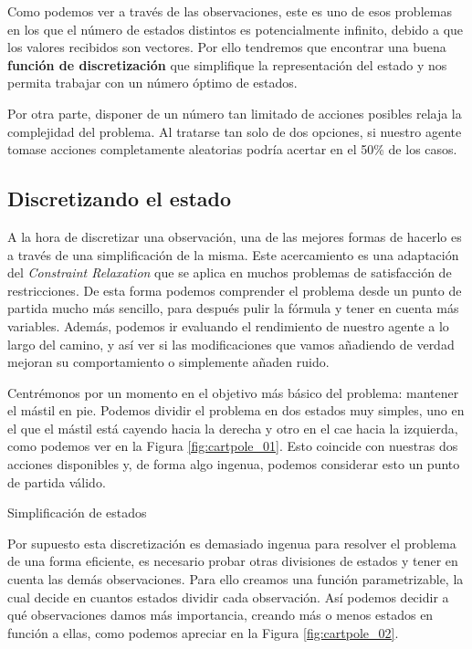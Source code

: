 Como podemos ver a través de las observaciones, este es uno de esos problemas en los que el número de estados distintos es potencialmente infinito, debido a que los valores recibidos son vectores. Por ello tendremos que encontrar una buena \textbf{función de discretización} que simplifique la representación del estado y nos permita trabajar con un número óptimo de estados.

Por otra parte, disponer de un número tan limitado de acciones posibles relaja la complejidad del problema. Al tratarse tan solo de dos opciones, si nuestro agente tomase acciones completamente aleatorias podría acertar en el 50\% de los casos.

\subsection{Discretizando el estado}
A la hora de discretizar una observación, una de las mejores formas de hacerlo es a través de una simplificación de la misma. Este acercamiento es una adaptación del \textit{Constraint Relaxation} que se aplica en muchos problemas de satisfacción de restricciones. De esta forma podemos comprender el problema desde un punto de partida mucho más sencillo, para después pulir la fórmula y tener en cuenta más variables. Además, podemos ir evaluando el rendimiento de nuestro agente a lo largo del camino, y así ver si las modificaciones que vamos añadiendo de verdad mejoran su comportamiento o simplemente añaden ruido.

Centrémonos por un momento en el objetivo más básico del problema: mantener el mástil en pie. Podemos dividir el problema en dos estados muy simples, uno en el que el mástil está cayendo hacia la derecha y otro en el cae hacia la izquierda, como podemos ver en la Figura \ref{fig:cartpole_01}. Esto coincide con nuestras dos acciones disponibles y, de forma algo ingenua, podemos considerar esto un punto de partida válido.

%
       {Simplificación de estados}

Por supuesto esta discretización es demasiado ingenua para resolver el problema de una forma eficiente, es necesario probar otras divisiones de estados y tener en cuenta las demás observaciones. Para ello creamos una función parametrizable, la cual decide en cuantos estados dividir cada observación. Así podemos decidir a qué observaciones damos más importancia, creando más o menos estados en función a ellas, como podemos apreciar en la Figura \ref{fig:cartpole_02}.

